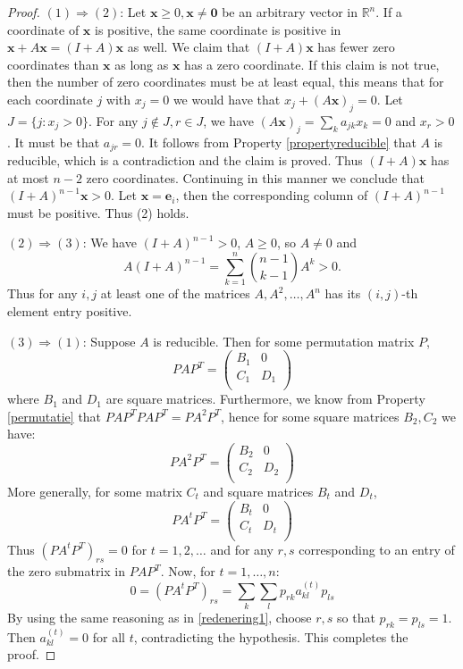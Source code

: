 \documentclass[a4paper,11pt]{report}
\newcommand{\R}{{\mathbb R}}
\begin{document}
\begin{proof}
  
  $(1) \Rightarrow (2)$: Let $\mathbf{x} \geq 0, \mathbf{x} \not = \mathbf{0}$ be an arbitrary vector in $\R^n$.
  If a coordinate of $\mathbf{x}$ is positive, the same coordinate is positive  in $\mathbf{x} + A\mathbf{x} = (I+A)\mathbf{x}$ 
  as well. We claim that $(I+A)\mathbf{x}$ has fewer zero coordinates than 
  $\mathbf{x}$ as long as $\mathbf{x}$ has a zero coordinate. If this claim is 
  not true, then the number of zero coordinates must be at least equal,
  this means that for each coordinate $j$ with $x_j = 0$ we would have that $x_j+ (A\mathbf{x})_j= 0$. Let $J = \{j: x_j > 0\}.$ For any $j \not \in J, r\in J$, we have 
  $(A\mathbf{x})_j = \sum_k a_{jk}x_k = 0$ and $x_r > 0$. 
  It must be that $a_{jr} = 0$. It follows from Property \ref{propertyreducible} that $A$ 
  is reducible, which is a contradiction and the claim is proved. Thus $(I+A)\mathbf{x}$ 
  has at most $n-2$ zero coordinates. Continuing in this manner we conclude that 
  $(I + A)^{n-1}\mathbf{x} > 0$. Let $\mathbf{x} = \mathbf{e}_i$, then the corresponding column of $(I+A)^{n-1}$ must be 
  positive. Thus (2) holds.
  
  $(2) \Rightarrow (3)$: We have $(I + A)^{n-1} > 0$, $A \geq 0$, so $A \not = 0$ 
  and 
  $$A(I+A)^{n-1} = \sum_{k=1}^n {n-1 \choose k-1} A^k > 0.$$
Thus for any $i, j$ at least one of the matrices $A, A^2,\ldots, A^n$ has its 
$(i,j)$-th element entry positive.

$(3) \Rightarrow (1)$: Suppose $A$ is reducible. Then for some permutation 
matrix $P$,
$$PAP^T = \begin{pmatrix}  B_1  & 0\\
 C_1  & D_1\\
\end{pmatrix} $$
where $B_1$ and $D_1$ are square matrices. Furthermore, we know from Property \ref{permutatie} that 
$PAP^TPAP^T = PA^2P^T$,
hence for some square matrices $B_2, C_2$ we have:
$$PA^2P^T = \begin{pmatrix}  B_2  & 0\\
 C_2  & D_2\\
\end{pmatrix} $$
More generally, for some matrix $C_t$ and square matrices $B_t$ and $D_t$,
$$PA^tP^T = \begin{pmatrix}  B_t  & 0\\
 C_t & D_t\\
\end{pmatrix} $$
Thus $(PA^tP^T)_{rs} = 0$ for $t = 1, 2,\ldots$ and for any $r,s$ 
corresponding to an entry of the zero submatrix in $PAP^T$.
Now, for $t = 1,\ldots,n:$
$$0 = (PA^tP^T)_{rs} = \sum_k\sum_l p_{r k}a_{kl}^{(t)}p_{l s}$$
By using the same reasoning as in \ref{redenering1}, choose $r,s$ so that $p_{r k} = p_{l s} = 1$. Then $a^{(t)}_{kl} = 0$ for all $t$,
contradicting the hypothesis. This completes the proof. 
 \end{proof}
 
\end{document}
